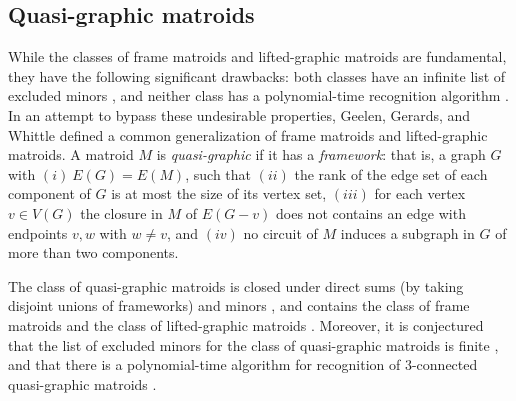 \documentclass[12pt]{article}
\theoremstyle{definition}
\theoremstyle{plain} %
\newcommand{\cB}{\mathcal{B}}
\begin{document}
\subsection{Quasi-graphic matroids} \label{sec: quasi-graphic matroids}

While the classes of frame matroids and lifted-graphic matroids are fundamental, they have the following significant drawbacks: both classes have an infinite list of excluded minors \cite{Chen-Geelen18}, and neither class has a polynomial-time recognition algorithm \cite{Chen-Whittle18}.
In an attempt to bypass these undesirable properties, Geelen, Gerards, and Whittle \cite{Geelen-Gerards-Whittle18} defined a common generalization of frame matroids and lifted-graphic matroids.
A matroid $M$ is \emph{quasi-graphic} if it has a \emph{framework}: that is, a graph $G$ with $(i) \ E(G)=E(M)$, such that $(ii)$ the rank of the edge set of each component of $G$ is at most the size of its vertex set, $(iii)$ for each vertex $v \in V(G)$ the closure in $M$ of $E(G-v)$ does not contains an edge with endpoints $v,w$ with $w \ne v$, and $(iv)$ no circuit of $M$ induces a subgraph in $G$ of more than two components. 

The class of quasi-graphic matroids is closed under direct sums (by taking disjoint unions of frameworks) and minors \cite[Lemma 4.1]{Geelen-Gerards-Whittle18}, and contains the class of frame matroids \cite[Theorem 1.3]{Geelen-Gerards-Whittle18} and the class of lifted-graphic matroids \cite[Theorem 1.2]{Geelen-Gerards-Whittle18}.
Moreover, it is conjectured that the list of excluded minors for the class of quasi-graphic matroids is finite \cite[Conjecture 1.5]{Chen-Geelen18}, and that there is a polynomial-time algorithm for recognition of $3$-connected quasi-graphic matroids \cite[Conjecture 1.7]{Geelen-Gerards-Whittle18}.
\end{document}
